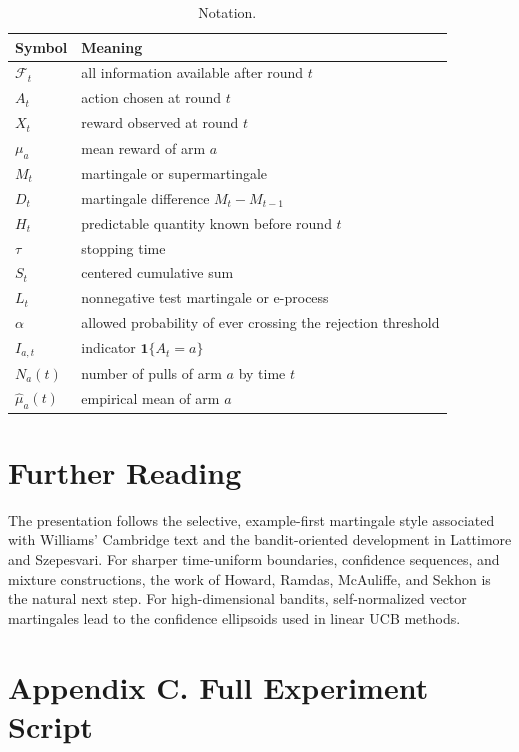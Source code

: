 \documentclass[en,nofont,11pt]{elegantbook}
\newcommand{\one}{\mathbf{1}}
\newcommand{\F}{\mathcal{F}}
\begin{document}
\begin{table}[H]
\centering
\caption*{Notation.}
\begin{tabular}{p{}p{}}
\toprule
Symbol & Meaning \\
\midrule
$\F_t$ & all information available after round $t$ \\
$A_t$ & action chosen at round $t$ \\
$X_t$ & reward observed at round $t$ \\
$\mu_a$ & mean reward of arm $a$ \\
$M_t$ & martingale or supermartingale \\
$D_t$ & martingale difference $M_t-M_{t-1}$ \\
$H_t$ & predictable quantity known before round $t$ \\
$\tau$ & stopping time \\
$S_t$ & centered cumulative sum \\
$L_t$ & nonnegative test martingale or e-process \\
$\alpha$ & allowed probability of ever crossing the rejection threshold \\
$I_{a,t}$ & indicator $\one\{A_t=a\}$ \\
$N_a(t)$ & number of pulls of arm $a$ by time $t$ \\
$\widehat\mu_a(t)$ & empirical mean of arm $a$ \\
\bottomrule
\end{tabular}
\end{table}

\chapter*{Further Reading}

The presentation follows the selective, example-first martingale style associated with Williams' Cambridge text and the bandit-oriented development in Lattimore and Szepesvari. For sharper time-uniform boundaries, confidence sequences, and mixture constructions, the work of Howard, Ramdas, McAuliffe, and Sekhon is the natural next step. For high-dimensional bandits, self-normalized vector martingales lead to the confidence ellipsoids used in linear UCB methods.


\chapter*{Appendix C. Full Experiment Script}



\nocite{williams1991probability,doob1953stochastic,ville1939etude,lattimore2020bandit,freedman1975tail,howard2020timeuniform,howard2021confidence,abbasi2011improved,jin2021batched,jin2022expts,kirschner2019context}
\printbibliography
\end{document}

